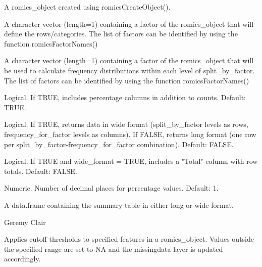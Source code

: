 \documentclass[a4paper]{book}
\begin{document}
\begin{Arguments}
\begin{ldescription}
\item[\code{romics\_object}] A romics\_object created using romicsCreateObject().

\item[\code{split\_by\_factor}] A character vector (length=1) containing a factor of the romics\_object that will define the rows/categories. The list of factors can be identified by using the function romicsFactorNames()

\item[\code{frequency\_for\_factor}] A character vector (length=1) containing a factor of the romics\_object that will be used to calculate frequency distributions within each level of split\_by\_factor. The list of factors can be identified by using the function romicsFactorNames()

\item[\code{percentage}] Logical. If TRUE, includes percentage columns in addition to counts. Default: TRUE.

\item[\code{wide\_format}] Logical. If TRUE, returns data in wide format (split\_by\_factor levels as rows, frequency\_for\_factor levels as columns).
If FALSE, returns long format (one row per split\_by\_factor-frequency\_for\_factor combination). Default: FALSE.

\item[\code{include\_totals}] Logical. If TRUE and wide\_format = TRUE, includes a "Total" column with row totals. Default: FALSE.

\item[\code{round\_percentages}] Numeric. Number of decimal places for percentage values. Default: 1.
\end{ldescription}
\end{Arguments}
%
\begin{Value}
A data.frame containing the summary table in either long or wide format.
\end{Value}
%
\begin{Author}
Geremy Clair
\end{Author}
%
\begin{Description}
Applies cutoff thresholds to specified features in a romics\_object. Values outside the specified range are set to NA and the missingdata layer is updated accordingly.
\end{Description}
\end{document}
